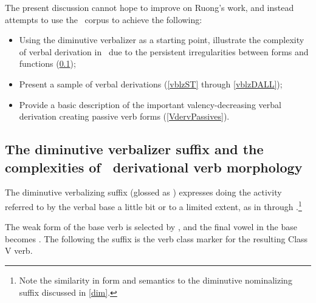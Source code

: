 The present discussion cannot hope to improve on Ruong’s work, and instead attempts to use the \PSDP\ corpus to achieve the following: 
\begin{itemize}
\item{Using the diminutive verbalizer  as a starting point, illustrate the complexity of verbal derivation in \PS\ due to the persistent irregularities between forms and functions (\SEC\ref{verbDIM});}
\item{Present a sample of verbal derivations (\SEC\ref{vblzST} through \SEC\ref{vblzDALL});}
\item{Provide a basic description of the important valency-decreasing verbal derivation creating passive verb forms (\SEC\ref{VdervPassives}).}
\end{itemize}



\subsection[The diminutive verbalizer suffix \It{-tj}]{The diminutive verbalizer suffix  and the complexities of \PS\ derivational verb morphology}\label{verbDIM}
The diminutive verbalizing suffix  (glossed as ) expresses doing the activity referred to by the verbal base a little bit or to a limited extent, as in  through .\footnote{Note the similarity in form and semantics to the diminutive nominalizing suffix  discussed in \SEC\ref{dim}.} %
\ea\label{verbDIMex1}
\z
\ea\label{verbDIMex2}
\z
\ea\label{verbDIMex3}
\z

The weak form of the base verb is selected by , and the final vowel in the base becomes . 
The  following the  suffix is the verb class marker for the resulting Class V verb. %

